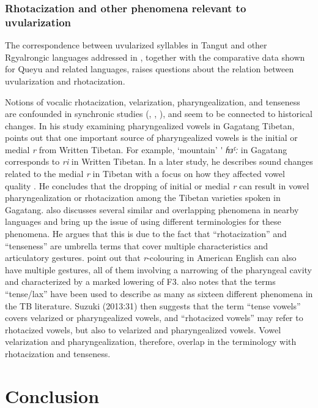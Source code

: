 \documentclass[output=paper]{langscibook}
\begin{document}
\subsubsection{Rhotacization and other phenomena relevant to uvularization}\label{sec:guan:3.5.2}


The correspondence between uvularized syllables in Tangut and other Rgyalrongic languages addressed in \citet{Gong2020}, together with the comparative data shown for Queyu and related languages, raises questions about the relation between uvularization and rhotacization. 

Notions of vocalic rhotacization, velarization, pharyngealization, and tenseness are confounded in synchronic studies (\citealt{Evans2006a,Evans2006b}, \citealt{Gong2020}, \citealt{Chirkova2024}), and seem to be connected to historical changes. In his study examining pharyngealized vowels in Gagatang Tibetan, \citet{Suzuki2011} points out that one important source of pharyngealized vowels is the initial or medial \textit{r} from Written Tibetan. For example, ‘mountain’  \'{} \textit{ɦɜˤː} in Gagatang corresponds to \textit{ri} in Written Tibetan. In a later study, he describes sound changes related to the medial \textit{r} in Tibetan with a focus on how they affected vowel quality \citep{Suzuki2013}. He concludes that the dropping of initial or medial \textit{r} can result in vowel pharyngealization or rhotacization among the Tibetan varieties spoken in Gagatang. \citet[30--31]{Suzuki2013} also discusses several similar and overlapping phenomena in nearby languages and bring up the issue of using different terminologies for these phenomena. He argues that this is due to the fact that “rhotacization” and “tenseness” are umbrella terms that cover multiple characteristics and articulatory gestures. \citet[229--230]{LadefogedJohnson2011} point out that \textit{r}-colouring in American English can also have multiple gestures, all of them involving a narrowing of the pharyngeal cavity and characterized by a marked lowering of F3. \citet[106]{Zhu2010} also notes that the terms “tense/lax” have been used to describe as many as sixteen different phenomena in the TB literature. Suzuki (2013ː31) then suggests that the term “tense vowels” covers velarized or pharyngealized vowels, and “rhotacized vowels” may refer to rhotacized vowels, but also to velarized and pharyngealized vowels. Vowel velarization and pharyngealization, therefore, overlap in the terminology with rhotacization and tenseness.

\section{Conclusion} \label{sec:guan:4}
\end{document}
